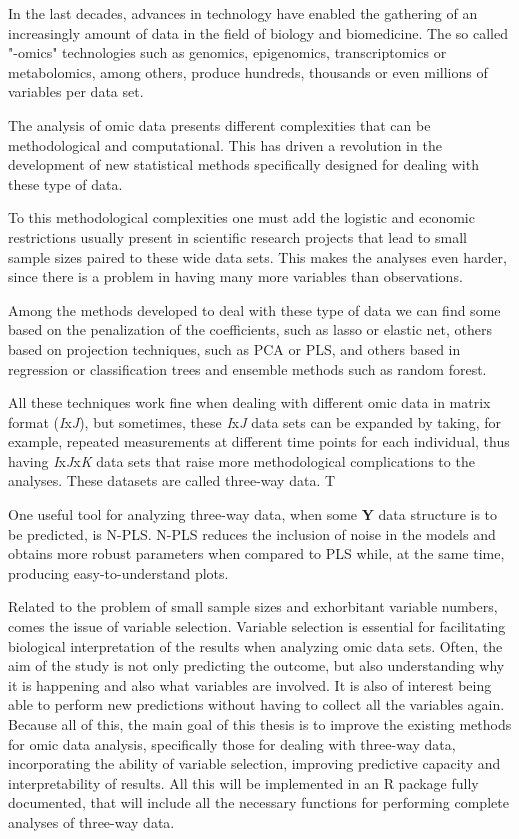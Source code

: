 In the last decades, advances in technology have enabled the gathering of an increasingly amount of data in the field of biology and biomedicine. The so called "-omics" technologies such as genomics, epigenomics, transcriptomics or metabolomics, among others, produce hundreds, thousands or even millions of variables per data set.

The analysis of omic data presents different complexities that can be methodological and computational. This has driven a revolution in the development of new statistical methods specifically designed for dealing with these type of data. 

To this methodological complexities one must add the logistic and economic restrictions usually present in scientific research projects that lead to small sample sizes paired to these wide data sets. This makes the analyses even harder, since there is a problem in having many more variables than observations.

Among the methods developed to deal with these type of data we can find some based on the penalization of the coefficients, such as lasso or elastic net, others based on projection techniques, such as PCA or PLS, and others based in regression or classification trees and ensemble methods such as random forest.

All these techniques work fine when dealing with different omic data in matrix format (\textit{I}x\textit{J}), but sometimes, these \textit{I}x\textit{J} data sets can be expanded by taking, for example, repeated measurements at different time points for each individual, thus having \textit{I}x\textit{J}x\textit{K} data sets that raise more methodological complications to the analyses. These datasets are called three-way data. T

One useful tool for analyzing three-way data, when some \textbf{Y} data structure is to be predicted, is N-PLS. N-PLS reduces the inclusion of noise in the models and obtains more robust parameters when compared to PLS while, at the same time, producing easy-to-understand plots.

Related to the problem of small sample sizes and exhorbitant variable numbers, comes the issue of variable selection. Variable selection is essential for facilitating biological interpretation of the results when analyzing omic data sets. Often, the aim of the study is not only predicting the outcome, but also understanding why it is happening and also what variables are involved. It is also of interest being able to perform new predictions without having to collect all the variables again. Because all of this, the main goal of this thesis is to improve the existing methods for omic data analysis, specifically those for dealing with three-way data, incorporating the ability of variable selection, improving predictive capacity and interpretability of results. All this will be implemented in an R package fully documented, that will include all the necessary functions for performing complete analyses of three-way data.

